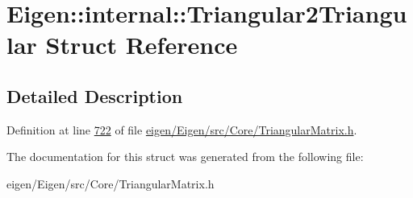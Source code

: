 \hypertarget{struct_eigen_1_1internal_1_1_triangular2_triangular}{}\section{Eigen\+:\+:internal\+:\+:Triangular2\+Triangular Struct Reference}
\label{struct_eigen_1_1internal_1_1_triangular2_triangular}


\subsection{Detailed Description}


Definition at line \hyperlink{eigen_2_eigen_2src_2_core_2_triangular_matrix_8h_source_l00722}{722} of file \hyperlink{eigen_2_eigen_2src_2_core_2_triangular_matrix_8h_source}{eigen/\+Eigen/src/\+Core/\+Triangular\+Matrix.\+h}.



The documentation for this struct was generated from the following file\+:\begin{DoxyCompactItemize}
\item 
eigen/\+Eigen/src/\+Core/\+Triangular\+Matrix.\+h\end{DoxyCompactItemize}
